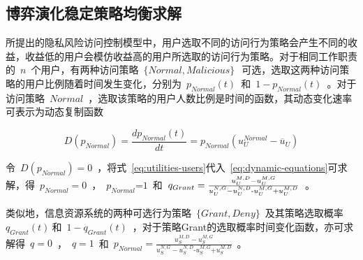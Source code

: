 \subsection{博弈演化稳定策略均衡求解}
\label{subsec:solution}
所提出的隐私风险访问控制模型中，用户选取不同的访问行为策略会产生不同的收益，收益低的用户会模仿收益高的用户所选取的访问行为策略。对于相同工作职责的~$n$~个用户，有两种访问策略~$\{Normal, Malicious\} ~$~可选，选取这两种访问策略的用户比例随着时间发生变化，分别为~$p_{Normal}(t)$~和~$1-p_{Normal}(t)$~。对于访问策略~$Normal$~，选取该策略的用户人数比例是时间的函数，其动态变化速率可表示为动态复制函数

\begin{equation}\label{eq:dynamic-equations}
D({{p}_{Normal}})=\frac{d{{p}_{Normal}}(t)}{dt}={{p}_{Normal}}(u_{U}^{Normal}-{{\overline{u}}_{U}})
\end{equation}

 令~$D({{p}_{Normal}})=0$~，将式~\ref{eq:utilities-users}代入~\ref{eq:dynamic-equations}可求解，得~${{p}_{Normal}}=0$~，~${{p}_{Normal}}\text{=}1$~和~${{q}_{Grant}}=\\\frac{u_{U}^{M,D}-u_{U}^{M,G}}{u_{U}^{N,G}-u_{U}^{N,D}\text{-}u_{U}^{M,G}\text{+}u_{U}^{M,D}}$~。
 
 类似地，信息资源系统的两种可选行为策略~$\{Grant,Deny\}$~及其策略选取概率~$q_{Grant}(t)~$和~$1-q_{Grant}(t)$~，对于策略Grant的选取概率时间变化函数，亦可求解得~$q=0$~，~$q=1$~和~${{p}_{Normal}}=\frac{u_{S}^{M,D}-u_{S}^{M,G}}{u_{S}^{N,G}-u_{S}^{N,D}\text{-}u_{S}^{M,G}\text{+}u_{S}^{M,D}}$~。

